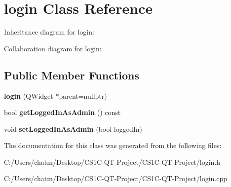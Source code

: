 \hypertarget{classlogin}{}\section{login Class Reference}
\label{classlogin}


Inheritance diagram for login\+:


Collaboration diagram for login\+:
\subsection*{Public Member Functions}
\begin{DoxyCompactItemize}
\item 
\mbox{\label{classlogin_ab0ef02ae84a8c877a3da00c9bb600d44}} 
{\bfseries login} (Q\+Widget $\ast$parent=nullptr)
\item 
\mbox{\label{classlogin_ac74a1e2cf3e9b0b2e8d0e8a3d5011d42}} 
bool {\bfseries get\+Logged\+In\+As\+Admin} () const
\item 
\mbox{\label{classlogin_a1c6b463c57cd207c628ce150364a7c0c}} 
void {\bfseries set\+Logged\+In\+As\+Admin} (bool logged\+In)
\end{DoxyCompactItemize}


The documentation for this class was generated from the following files\+:\begin{DoxyCompactItemize}
\item 
C\+:/\+Users/chatm/\+Desktop/\+C\+S1\+C-\/\+Q\+T-\/\+Project/\+C\+S1\+C-\/\+Q\+T-\/\+Project/login.\+h\item 
C\+:/\+Users/chatm/\+Desktop/\+C\+S1\+C-\/\+Q\+T-\/\+Project/\+C\+S1\+C-\/\+Q\+T-\/\+Project/login.\+cpp\end{DoxyCompactItemize}

